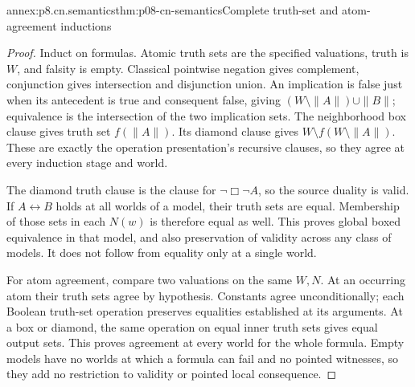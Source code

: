 \begin{annexitem}{annex:p8.cn.semantics}{thm:p08-cn-semantics}{Complete truth-set and atom-agreement inductions}
\begin{proof}
Induct on formulas. Atomic truth sets are the specified valuations,
truth is \(W\), and falsity is empty. Classical pointwise negation
gives complement, conjunction gives intersection and disjunction union.
An implication is false just when its antecedent is true and consequent
false, giving \((W\setminus\|A\|)\cup\|B\|\); equivalence
is the intersection of the two implication sets.
The neighborhood box clause gives truth set \(f(\|A\|)\).
Its diamond clause gives \(W\setminus f(W\setminus\|A\|)\).
These are exactly the operation presentation's recursive clauses,
so they agree at every induction stage and world.

The diamond truth clause is the clause for \(\neg\Box\neg A\),
so the source duality is valid. If \(A\leftrightarrow B\)
holds at all worlds of a model, their truth sets are equal. Membership
of those sets in each \(N(w)\) is therefore equal as well.
This proves global boxed equivalence in that model, and also
preservation of validity across any class of models. It does not
follow from equality only at a single world.

For atom agreement, compare two valuations on the same \(W,N\).
At an occurring atom their truth sets agree by hypothesis. Constants
agree unconditionally; each Boolean truth-set operation preserves
equalities established at its arguments. At a box or diamond, the
same operation on equal inner truth sets gives equal output sets.
This proves agreement at every world for the whole formula.
Empty models have no worlds at which a formula can fail and no
pointed witnesses, so they add no restriction to validity or
pointed local consequence.
\end{proof}
\end{annexitem}

